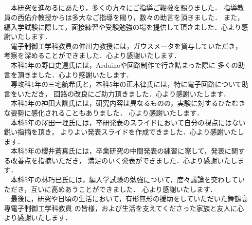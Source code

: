 \begin{center}
\section*{}                      %
\vspace*{-2zh}
\end{center}

　本研究を進めるにあたり，多くの方々にご指導ご鞭撻を賜りました．
指導教員の西佑介教授からは多大なご指導を賜り，数々の助言を頂きました．
また，編入学試験に際して，面接練習や受験勉強の場を提供して頂きました．心より感謝いたします．\\
　電子制御工学科教員の仲川力教授には，ガウスメータを貸与していただき，
考察を深めることができました．心より感謝いたします．\\
　本科5年の野口史遠氏には，Arduinoや回路制作で行き詰まった際に
多くの助言を頂きました．心より感謝いたします．\\
　専攻科1年の三宅航希氏と，本科5年の正木律氏には，特に電子回路について助言をいただき，
回路の改良にご助力頂きました．心より感謝いたします．\\
　本科5年の神田大訓氏には，研究内容は異なるものの，実験に対するひたむきな姿勢に感化されることもありました．
心より感謝いたします．\\
　本科5年の澤田一理氏には，卒研発表のスライドにおいて自分の視点にはない鋭い指摘を頂き，
よりよい発表スライドを作成できました．心より感謝いたします．\\
　本科5年の櫻井蒼真氏には，卒業研究の中間発表の練習に際して，発表に関する改善点を指摘いただき，
満足のいく発表ができました．心より感謝いたします．\\
　本科5年の林巧巳氏には，編入学試験の勉強について，度々議論を交わしていただき，互いに高めあうことができました．
心より感謝いたします．\\
　最後に，研究や日頃の生活において，有形無形の援助をしていただいた舞鶴高専電子制御工学科教員
の皆様，および生活を支えてくださった家族と友人に心より感謝いたします．\\